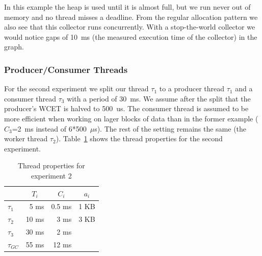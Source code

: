 In this example the heap is used until it is almost full, but we run
never out of memory and no thread misses a deadline. From the
regular allocation pattern we also see that this collector runs
concurrently. With a stop-the-world collector we would notice gaps
of 10~ms (the measured execution time of the collector) in the
graph.

\subsubsection{Producer/Consumer Threads}

For the second experiment we split our thread $\tau_1$ to a producer
thread $\tau_1$ and a consumer thread $\tau_3$ with a period of
30~ms. We assume after the split that the producer's WCET is halved
to 500~us. The consumer thread is assumed to be more efficient when
working on lager blocks of data than in the former example
($C_3$=2~ms instead of 6*500~$\mu$s). The rest of the setting
remains the same (the worker thread $\tau_2$). Table~\ref{fig:ex2}
shows the thread properties for the second experiment.

\begin{table}[tb]
\begin{center}
\begin{tabular}{lrrr}
    \toprule
    & \multicolumn{1}{c}{$T_i$} & \multicolumn{1}{c}{$C_i$} &\multicolumn{1}{c}{$a_i$} \\
    \midrule
    $\tau_1$ & 5 ms & 0.5 ms & 1 KB \\
    $\tau_2$ & 10 ms & 3 ms & 3 KB \\
    $\tau_3$ & 30 ms & 2 ms & \\
    $\tau_{GC}$ & 55 ms & 12 ms & \\
    \bottomrule
\end{tabular}
    \caption{Thread properties for experiment 2}
\label{fig:ex2}
\end{center}
\end{table}

